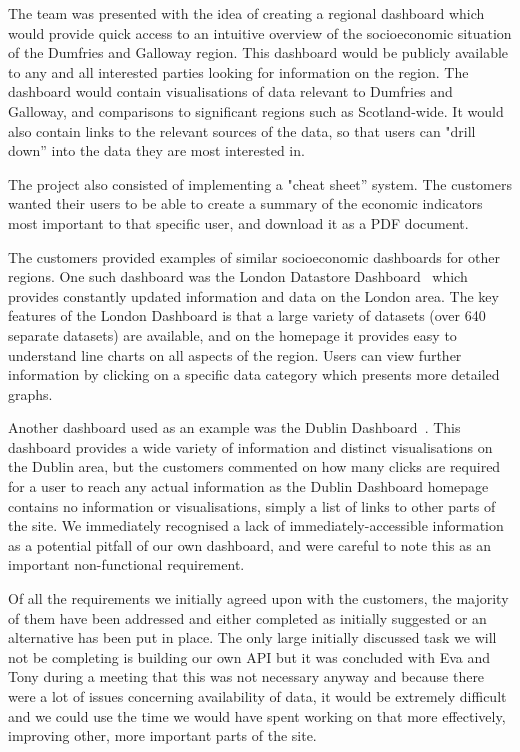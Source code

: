 \documentclass{l3proj}
\begin{document}
The team was presented with the idea of creating a regional dashboard which would provide quick access to an intuitive overview of the socioeconomic situation of the Dumfries and Galloway region. This dashboard would be publicly available to any and all interested parties looking for information on the region. The dashboard would contain visualisations of data relevant to Dumfries and Galloway, and comparisons to significant regions such as Scotland-wide. It would also contain links to the relevant sources of the data, so that users can "drill down'' into the data they are most interested in.

The project also consisted of implementing a "cheat sheet'' system. The customers wanted their users to be able to create a summary of the economic indicators most important to that specific user, and download it as a PDF document.

The customers provided examples of similar socioeconomic dashboards for other regions. One such dashboard was the London Datastore Dashboard~\cite{LondonDashboard} which provides constantly updated information and data on the London area. The key features of the London Dashboard is that a large variety of datasets (over 640 separate datasets) are available, and on the homepage it provides easy to understand line charts on all aspects of the region. Users can view further information by clicking on a specific data category which presents more detailed graphs.

Another dashboard used as an example was the Dublin Dashboard~\cite{DublinDashboard}. This dashboard provides a wide variety of information and distinct visualisations on the Dublin area, but the customers commented on how many clicks are required for a user to reach any actual information as the Dublin Dashboard homepage contains no information or visualisations, simply a list of links to other parts of the site. We immediately recognised a lack of immediately-accessible information as a potential pitfall of our own dashboard, and were careful to note this as an important non-functional requirement.


Of all the requirements we initially agreed upon with the customers, the majority of them have been addressed and either completed as initially suggested
or an alternative has been put in place. The only large initially discussed task we will not be completing is building our own API but it was concluded
with Eva and Tony during a meeting that this was not necessary anyway and because there were a lot of issues concerning availability of data, it would be
extremely difficult and we could use the time we would have spent working on that more effectively, improving other, more important parts of the site.
\end{document}
